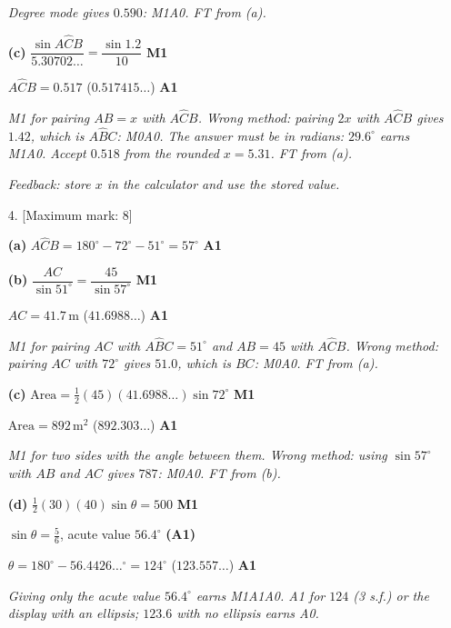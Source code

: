 \documentclass[12pt, twoside]{article}
\begin{document}
\begin{enumerate}[itemsep=0.3cm]
\emph{Degree mode gives $0.590$: M1A0. FT from (a).}

\textbf{(c)} $\dfrac{\sin A\hat{C}B}{5.30702\ldots} = \dfrac{\sin 1.2}{10}$ \hfill \textbf{M1}

$A\hat{C}B = 0.517$ \quad ($0.517415\ldots$) \hfill \textbf{A1}

\emph{M1 for pairing $AB = x$ with $A\hat{C}B$. Wrong method: pairing $2x$
with $A\hat{C}B$ gives $1.42$, which is $A\hat{B}C$: M0A0. The answer must
be in radians: $29.6^\circ$ earns M1A0. Accept $0.518$ from the rounded
$x = 5.31$. FT from (a).}

\emph{Feedback: store $x$ in the calculator and use the stored value.}

\newpage

\item[4.] [Maximum mark: 8]

\textbf{(a)} $A\hat{C}B = 180^\circ - 72^\circ - 51^\circ = 57^\circ$ \hfill \textbf{A1}

\textbf{(b)} $\dfrac{AC}{\sin 51^\circ} = \dfrac{45}{\sin 57^\circ}$ \hfill \textbf{M1}

$AC = 41.7\,\text{m}$ \quad ($41.6988\ldots$) \hfill \textbf{A1}

\emph{M1 for pairing $AC$ with $A\hat{B}C = 51^\circ$ and $AB = 45$ with
$A\hat{C}B$. Wrong method: pairing $AC$ with $72^\circ$ gives $51.0$, which
is $BC$: M0A0. FT from (a).}

\textbf{(c)} $\text{Area} = \frac{1}{2}(45)(41.6988\ldots)\sin 72^\circ$ \hfill \textbf{M1}

$\text{Area} = 892\,\text{m}^{2}$ \quad ($892.303\ldots$) \hfill \textbf{A1}

\emph{M1 for two sides with the angle between them. Wrong method: using
$\sin 57^\circ$ with $AB$ and $AC$ gives $787$: M0A0. FT from (b).}

\textbf{(d)} $\frac{1}{2}(30)(40)\sin\theta = 500$ \hfill \textbf{M1}

$\sin\theta = \frac{5}{6}$, \quad acute value $56.4^\circ$ \hfill \textbf{(A1)}

$\theta = 180^\circ - 56.4426\ldots^\circ = 124^\circ$ \quad ($123.557\ldots$) \hfill \textbf{A1}

\emph{Giving only the acute value $56.4^\circ$ earns M1A1A0. A1 for $124$
(3 s.f.) or the display with an ellipsis; $123.6$ with no ellipsis earns
A0.}


\end{enumerate}
\end{document}
